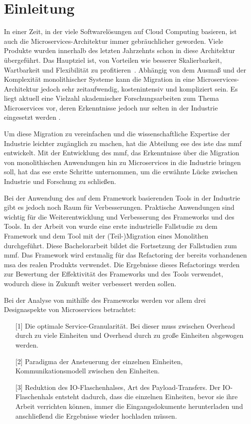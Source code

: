 \chapter{Einleitung}
\label{chap:einleitung}

In einer Zeit, in der viele Softwarelösungen auf Cloud Computing basieren, ist auch die Mi\-cro\-services-Architektur immer gebräuchlicher geworden.
Viele Produkte wurden innerhalb des letzten Jahrzehnts schon in diese Architektur übergeführt.
Das Hauptziel ist, von Vorteilen wie besserer Skalierbarkeit, Wartbarkeit und Flexibilität zu profitieren~\cite{Fritzsch_2019,taibi2017processmotivations}.
Abhängig von dem Ausmaß und der Komplexität monolithischer Systeme kann die Migration in eine Microservices-Architektur jedoch sehr zeitaufwendig, kostenintensiv und kompliziert sein.
Es liegt aktuell eine Vielzahl akademischer Forschungsarbeiten zum Thema Microservices vor, deren Erkenntnisse jedoch nur selten in der Industrie eingesetzt werden \cite{fritzsch2022architecturecentric}.

Um diese Migration zu vereinfachen und die wissenschaftliche Expertise der Industrie leichter zugänglich zu machen, hat die Abteilung \gls{ese} des \gls{iste} das \gls{mmf} entwickelt.
Mit der Entwicklung des \gls{mmf}, das Erkenntnisse über die Migration von monolithischen Anwendungen hin zu Microservices in die Industrie bringen soll, hat das \gls{ese} erste Schritte unternommen, um die erwähnte Lücke zwischen Industrie und Forschung zu schließen.

Bei der Anwendung des auf dem Framework basierenden Tools in der Industrie gibt es jedoch noch Raum für Verbesserungen.
Praktische Anwendungen sind wichtig für die Weiterentwicklung und Verbesserung des Frameworks und des Tools.
In der Arbeit von  wurde eine erste industrielle Fallstudie zu dem Framework und dem Tool mit der (Teil-)Migration eines Monolithen durchgeführt.
Diese Bachelorarbeit bildet die Fortsetzung der Fallstudien zum \gls{mmf}.
Das Framework wird erstmalig für das Refactoring der bereits vorhandenen \gls{msa} des realen Produkts \jf verwendet.
Die Ergebnisse dieses Refactorings werden zur Bewertung der Effektivität des Frameworks und des Tools verwendet, wodurch diese in Zukunft weiter verbessert werden sollen.

Bei der Analyse von \jf mithilfe des Frameworks werden vor allem drei Designaspekte von Microservices betrachtet:
\begin{enumerate}
	\item[{[1]}] Die optimale Service-Granularität. Bei dieser muss zwischen Overhead durch zu viele Einheiten und Overhead durch zu große Einheiten abgewogen werden.
	\item[{[2]}] Paradigma der Ansteuerung der einzelnen Einheiten, Kommunikationsmodell zwischen den Einheiten.
	\item[{[3]}] Reduktion des IO-Flaschenhalses, Art des Payload-Transfers. %
	Der IO-Flaschenhals entsteht dadurch, dass die einzelnen Einheiten, bevor sie ihre Arbeit verrichten können, immer die Eingangsdokumente herunterladen und anschließend die Ergebnisse wieder hochladen müssen.
\end{enumerate}

